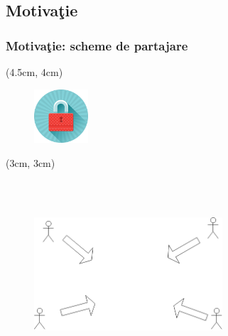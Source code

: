 \documentclass{beamer}
\begin{document}
\subsection{Motiva\c{t}ie}
\begin{frame}
    \frametitle{Motiva\c{t}ie: scheme de partajare} %
     {
        \begin{textblock*}{4cm}(4.5cm, 4cm)
        \begin{figure}
            \includegraphics[width=2cm,height=2cm,keepaspectratio]{img/motivation/Lock.png}
        \end{figure}
        \end{textblock*}
    }
     {
        \begin{textblock*}{4cm}(3cm, 3cm)
        \begin{figure}
            \includegraphics[width=7cm,height=7cm,keepaspectratio]{img/motivation/all_in.png}
        \end{figure}
        \end{textblock*}

}
\end{frame}
\end{document}
